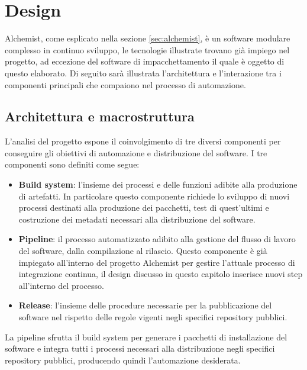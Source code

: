 
\chapter{Design}
Alchemist, come esplicato nella sezione \ref{sec:alchemist}, è un software modulare complesso in continuo sviluppo, le tecnologie illustrate trovano già impiego nel progetto, ad eccezione del software di impacchettamento il quale è oggetto di questo elaborato. Di seguito sarà illustrata l'architettura e l'interazione tra i componenti principali che compaiono nel processo di automazione.

\section{Architettura e macrostruttura}
L'analisi del progetto espone il coinvolgimento di tre diversi componenti per conseguire gli obiettivi di automazione e distribuzione del software. I tre componenti sono definiti come segue: 
\begin{itemize}
	\item \textbf{Build system}: l'insieme dei processi e delle funzioni adibite alla produzione di artefatti. In particolare questo componente richiede lo sviluppo di nuovi processi destinati alla produzione dei pacchetti, test di quest'ultimi e costruzione dei metadati necessari alla distribuzione del software.
	\item \textbf{Pipeline}: il processo automatizzato adibito alla gestione del flusso di lavoro del software, dalla compilazione al rilascio. Questo componente è già impiegato all'interno del progetto Alchemist per gestire l'attuale processo di integrazione continua, il design discusso in questo capitolo inserisce nuovi step all'interno del processo.
	\item \textbf{Release}: l'insieme delle procedure necessarie per la pubblicazione del software nel rispetto delle regole vigenti negli specifici repository pubblici.
\end{itemize}
La pipeline sfrutta il build system per generare i pacchetti di installazione del software e integra tutti i processi necessari alla distribuzione negli specifici repository pubblici, producendo quindi l'automazione desiderata.

